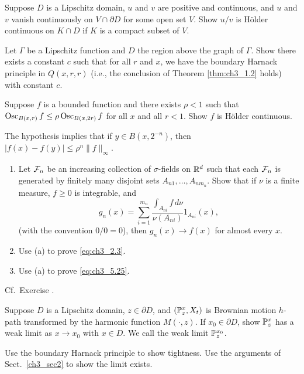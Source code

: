 \begin{exercise}\label{ex:ch3_10}
Suppose $D$ is a Lipschitz domain, $u$ and $v$ are positive and continuous, and $u$ and $v$ vanish continuously on $V \cap \partial D$ for some open set $V$. Show $u/v$ is H\"older continuous on $K \cap D$ if $K$ is a compact subset of $V$.
\end{exercise}

\begin{exercise}\label{ex:ch3_11}
Let $\Gamma$ be a Lipschitz function and $D$ the region above the graph of $\Gamma$. Show there exists a constant $c$ such that for all $r$ and $x$, we have the boundary Harnack principle in $Q(x,r,r)$ (i.e., the conclusion of Theorem \ref{thm:ch3_1.2} holds) with constant $c$.
\end{exercise}

\begin{exercise}\label{ex:ch3_12}
Suppose $f$ is a bounded function and there exists $\rho < 1$ such that $\Osc_{B(x,r)} f \leq \rho\Osc_{B(x,2r)} f$ for all $x$ and all $r < 1$. Show $f$ is H\"older continuous.

\mpagebreak

\hint The hypothesis implies that if $y \in B(x,2^{-n})$, then $|f(x)-f(y)| \leq \rho^n\|f\|_\infty$.
\end{exercise}

\begin{exercise}\label{ex:ch3_13}
\begin{enumerate}[wide, labelindent=0em, labelwidth=\parindent, labelsep = 0em]
    \item Let $\FC_n$ be an increasing collection of $\sigma$-fields on $\R^d$ such that each $\FC_n$ is generated by finitely many disjoint sets $A_{n1},\ldots,A_{nm_n}$. Show that if $\nu$ is a finite measure, $f \geq 0$ is integrable, and
    \[
        g_n(x) = \sum_{i=1}^{m_n} \frac{\int_{A_{ni}} f\,d\nu}{\nu(A_{ni})}1_{A_{ni}}(x),
    \]
    (with the convention $0/0 = 0$), then $g_n(x) \to f(x)$ for almost every $x$.
    \item Use (a) to prove \eqref{eq:ch3_2.3}.
    \item Use (a) to prove \eqref{eq:ch3_5.25}.
\end{enumerate}

\hint Cf.\ Exercise .
\end{exercise}

\begin{exercise}\label{ex:ch3_14}
Suppose $D$ is a Lipschitz domain, $z \in \partial D$, and $(\P_z^x,X_t)$ is Brownian motion $h$-path transformed by the harmonic function $M(\cdot,z)$. If $x_0 \in \partial D$, show $\P_z^x$ has a weak limit as $x \to x_0$ with $x \in D$. We call the weak limit $\P_{z}^{x_0}$.

\hint Use the boundary Harnack principle to show tightness. Use the arguments of Sect.\ \ref{ch3_sec2} to show the limit exists.
\end{exercise}

